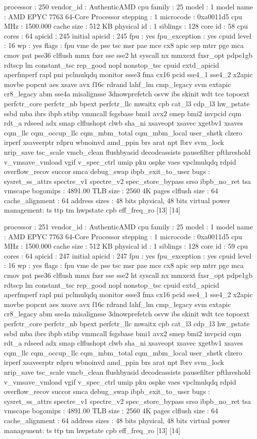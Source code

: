 processor	: 250
vendor_id	: AuthenticAMD
cpu family	: 25
model		: 1
model name	: AMD EPYC 7763 64-Core Processor
stepping	: 1
microcode	: 0xa0011d5
cpu MHz		: 1500.000
cache size	: 512 KB
physical id	: 1
siblings	: 128
core id		: 58
cpu cores	: 64
apicid		: 245
initial apicid	: 245
fpu		: yes
fpu_exception	: yes
cpuid level	: 16
wp		: yes
flags		: fpu vme de pse tsc msr pae mce cx8 apic sep mtrr pge mca cmov pat pse36 clflush mmx fxsr sse sse2 ht syscall nx mmxext fxsr_opt pdpe1gb rdtscp lm constant_tsc rep_good nopl nonstop_tsc cpuid extd_apicid aperfmperf rapl pni pclmulqdq monitor ssse3 fma cx16 pcid sse4_1 sse4_2 x2apic movbe popcnt aes xsave avx f16c rdrand lahf_lm cmp_legacy svm extapic cr8_legacy abm sse4a misalignsse 3dnowprefetch osvw ibs skinit wdt tce topoext perfctr_core perfctr_nb bpext perfctr_llc mwaitx cpb cat_l3 cdp_l3 hw_pstate ssbd mba ibrs ibpb stibp vmmcall fsgsbase bmi1 avx2 smep bmi2 invpcid cqm rdt_a rdseed adx smap clflushopt clwb sha_ni xsaveopt xsavec xgetbv1 xsaves cqm_llc cqm_occup_llc cqm_mbm_total cqm_mbm_local user_shstk clzero irperf xsaveerptr rdpru wbnoinvd amd_ppin brs arat npt lbrv svm_lock nrip_save tsc_scale vmcb_clean flushbyasid decodeassists pausefilter pfthreshold v_vmsave_vmload vgif v_spec_ctrl umip pku ospke vaes vpclmulqdq rdpid overflow_recov succor smca debug_swap ibpb_exit_to_user
bugs		: sysret_ss_attrs spectre_v1 spectre_v2 spec_store_bypass srso ibpb_no_ret tsa vmscape
bogomips	: 4891.00
TLB size	: 2560 4K pages
clflush size	: 64
cache_alignment	: 64
address sizes	: 48 bits physical, 48 bits virtual
power management: ts ttp tm hwpstate cpb eff_freq_ro [13] [14]

processor	: 251
vendor_id	: AuthenticAMD
cpu family	: 25
model		: 1
model name	: AMD EPYC 7763 64-Core Processor
stepping	: 1
microcode	: 0xa0011d5
cpu MHz		: 1500.000
cache size	: 512 KB
physical id	: 1
siblings	: 128
core id		: 59
cpu cores	: 64
apicid		: 247
initial apicid	: 247
fpu		: yes
fpu_exception	: yes
cpuid level	: 16
wp		: yes
flags		: fpu vme de pse tsc msr pae mce cx8 apic sep mtrr pge mca cmov pat pse36 clflush mmx fxsr sse sse2 ht syscall nx mmxext fxsr_opt pdpe1gb rdtscp lm constant_tsc rep_good nopl nonstop_tsc cpuid extd_apicid aperfmperf rapl pni pclmulqdq monitor ssse3 fma cx16 pcid sse4_1 sse4_2 x2apic movbe popcnt aes xsave avx f16c rdrand lahf_lm cmp_legacy svm extapic cr8_legacy abm sse4a misalignsse 3dnowprefetch osvw ibs skinit wdt tce topoext perfctr_core perfctr_nb bpext perfctr_llc mwaitx cpb cat_l3 cdp_l3 hw_pstate ssbd mba ibrs ibpb stibp vmmcall fsgsbase bmi1 avx2 smep bmi2 invpcid cqm rdt_a rdseed adx smap clflushopt clwb sha_ni xsaveopt xsavec xgetbv1 xsaves cqm_llc cqm_occup_llc cqm_mbm_total cqm_mbm_local user_shstk clzero irperf xsaveerptr rdpru wbnoinvd amd_ppin brs arat npt lbrv svm_lock nrip_save tsc_scale vmcb_clean flushbyasid decodeassists pausefilter pfthreshold v_vmsave_vmload vgif v_spec_ctrl umip pku ospke vaes vpclmulqdq rdpid overflow_recov succor smca debug_swap ibpb_exit_to_user
bugs		: sysret_ss_attrs spectre_v1 spectre_v2 spec_store_bypass srso ibpb_no_ret tsa vmscape
bogomips	: 4891.00
TLB size	: 2560 4K pages
clflush size	: 64
cache_alignment	: 64
address sizes	: 48 bits physical, 48 bits virtual
power management: ts ttp tm hwpstate cpb eff_freq_ro [13] [14]

